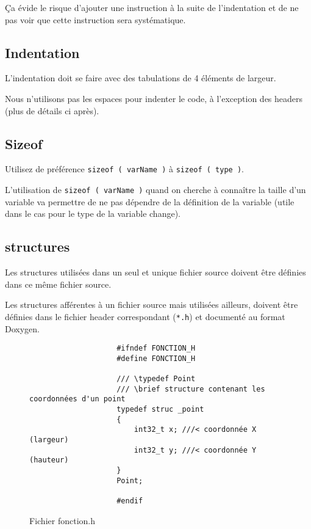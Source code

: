 			Ça évide le risque d’ajouter une instruction à la suite de l’indentation et de ne pas voir que cette instruction sera systématique.

		\subsection{Indentation}
			L'indentation doit se faire avec des tabulations de 4 éléments de largeur.

			Nous n'utilisons pas les espaces pour indenter le code, à l’exception des headers (plus de détails ci après).

		\subsection{Sizeof}
			Utilisez de préférence \verb+sizeof ( varName )+ à \verb+sizeof ( type )+.

			L'utilisation de \verb+sizeof ( varName )+ quand on cherche à connaître la taille d'un variable va permettre de ne pas dépendre de la définition de la variable (utile dans le cas pour le type de la variable change).

		\subsection{structures}
			Les structures utilisées dans un seul et unique fichier source doivent être définies dans ce même fichier source.

			Les structures afférentes à un fichier source mais utilisées ailleurs, doivent être définies dans le fichier header correspondant (\verb+*.h+) et documenté au format Doxygen.

			\begin{figure}[H]
				\begin{changemargin}{-2.5cm}{-2.5cm}
				\begin{tcolorbox}
				\begin{verbatim}
					#ifndef FONCTION_H
					#define FONCTION_H

					/// \typedef Point
					/// \brief structure contenant les coordonnées d'un point
					typedef struc _point
					{
					    int32_t x; ///< coordonnée X (largeur)
					    int32_t y; ///< coordonnée Y (hauteur)
					}
					Point;

					#endif
				\end{verbatim}
				\end{tcolorbox}
				\end{changemargin}
				\caption{Fichier fonction.h}
			\end{figure}

